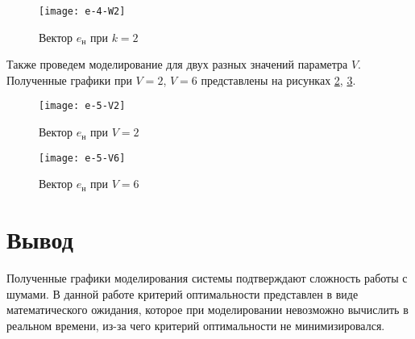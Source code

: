 \documentclass[14pt, a4paper]{extarticle}
\begin{document}
	\begin{figure}[H]
		\centering
		\texttt{[image: e-4-W2]}
		\caption{Вектор $e_\text{н}$ при $k=2$}
		\label{fig:e-4-W2}
	\end{figure}
	
	Также проведем моделирование для двух разных значений параметра $V$. Полученные графики при $V=2$, $V=6$ представлены на рисунках \ref{fig:e-5-V2}, \ref{fig:e-5-V6}.
	
	\begin{figure}[H]
		\centering
		\texttt{[image: e-5-V2]}
		\caption{Вектор $e_\text{н}$ при $V=2$}
		\label{fig:e-5-V2}
	\end{figure}
	
	\begin{figure}[H]
		\centering
		\texttt{[image: e-5-V6]}
		\caption{Вектор $e_\text{н}$ при $V=6$}
		\label{fig:e-5-V6}
	\end{figure}
	
	\newpage
	
	\section*{Вывод}
	
	Полученные графики моделирования системы подтверждают сложность работы с шумами. В данной работе критерий оптимальности представлен в виде математического ожидания, которое при моделировании невозможно вычислить в реальном времени, из-за чего критерий оптимальности не минимизировался.
\end{document}
